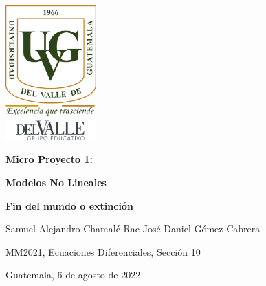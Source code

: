 \pagecolor{white}\afterpage{\nopagecolor}

\newcommand{\blank}[1]{\hspace*{#1}\linebreak[0]}

\includegraphics[width=3.5cm]{images/Uvg_logo.jpg}
\vspace{1.4in}

\fontsize{45}{50}\selectfont \textcolor{FSBlue}{\textbf{Micro Proyecto 1:}}

\fontsize{45}{50}\selectfont \textcolor{FSBlue}{\textbf{Modelos No Lineales}}

\vspace{10mm}
\LARGE\textcolor{FSBlue}{\textbf{Fin del mundo o extinción}}

\vspace{0.5in}

\Large\textcolor{FSBlue}{Samuel Alejandro Chamalé Rac\blank}
\Large\textcolor{FSBlue}{José Daniel Gómez Cabrera}

\vspace{1.9in}

\begin{flushright}
\Large\textcolor{FSBlue}{MM2021, Ecuaciones Diferenciales, Sección 10\blank{10mm}}
\end{flushright}


\vspace{0.4in}


\begin{center}
\Large\textcolor{FSBlue}{Guatemala, 6 de agosto de 2022}
\end{center} 

\thispagestyle{empty}
\restoregeometry   
\newpage